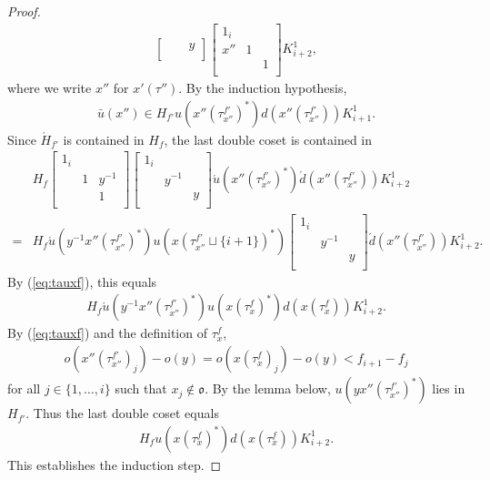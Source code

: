 \documentclass[11pt]{amsart}
\newcommand\oo{\mathfrak{o}}
\newcommand\1{\mathbf{1}}
\newcommand\ac{\acute}
\newcommand\bu{\bar{u}}
\numberwithin{equation}{section}
\begin{document}
\begin{proof}
\begin{align*}
\begin{bmatrix}
 & &y  \\
\end{bmatrix}\begin{bmatrix}
1_{i} & & \\
x'' &1 &  \\
& &1  \\
\end{bmatrix} K_{i+2}^1, 
\end{align*} 
where we write $x''$ for $x'(\tau'')$.
By the induction hypothesis, 
\begin{align*}
\bu(x'') \in H_{f'} u(x''(\tau_{x''}^{f'})^*)d(x''(\tau_{x''}^{f'})) K_{i+1}^1.
\end{align*} 
Since $\ac{H}_{f'}$ is contained in $H_f$, the last double coset is contained in 
\begin{align*}
& H_f \begin{bmatrix}
1_{i} & & \\
 &1 & y^{-1}  \\
 & &1  \\
\end{bmatrix}
\begin{bmatrix}
1_{i} & & \\
 &y^{-1} &  \\
 & &y  \\
\end{bmatrix} \ac{u}(x''(\tau_{x''}^{f'})^*)\ac{d}(x''(\tau_{x''}^{f'})) K_{i+2}^1 \\
=& 
H_f \ac{u}(y^{-1}x''(\tau_{x''}^{f'})^*) u(x(\tau_{x''}^{f'} \sqcup \{ i + 1\})^*) \begin{bmatrix}
1_{i} & & \\
 &y^{-1} &  \\
 & &y  \\
\end{bmatrix} \ac{d}(x''(\tau_{x''}^{f'})) K_{i+2}^1.
\end{align*} 
By (\ref{eq:tauxf}), this equals 
\begin{align*}
H_f \ac{u}(y^{-1}x''(\tau_{x''}^{f'})^*) u(x(\tau_x^f)^*) d(x(\tau_x^f)) K_{i+2}^1.
\end{align*}  
By (\ref{eq:tauxf}) and the definition of $\tau_x^f$,
\begin{align*}
o(x''(\tau_{x''}^{f'})_j) -o(y) = o(x(\tau_x^f)_j) -o(y) < f_{i+1} -  f_j
\end{align*} 
for all $ j \in \{1, \ldots, i \}$ such that $x_j \not\in \oo$.
By the lemma below, $u(y x''(\tau_{x''}^{f'})^*)$ lies in $H_{f'}$.
Thus the last double coset equals 
\begin{align*}
H_f u(x(\tau_x^f)^*) d(x(\tau_x^f)) K_{i+2}^1.
\end{align*}
This establishes the induction step.
\end{proof}
\end{document}
